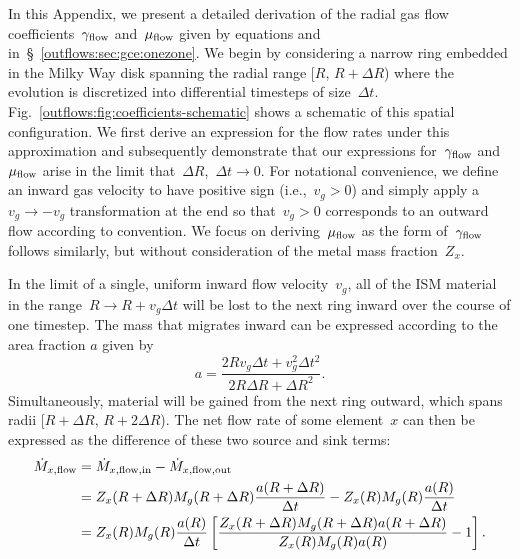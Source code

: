 \documentclass[main.tex]{subfiles}
\begin{document}
In this Appendix, we present a detailed derivation of the radial gas flow
coefficients~$\gamma_{\text{flow}}$ and~$\mu_{\text{flow}}$ given by equations
 and~
in~\S~\ref{outflows:sec:gce:onezone}.
We begin by considering a narrow ring embedded in the Milky Way disk spanning
the radial range [$R$, $R + \Delta R$) where the evolution is discretized into
differential timesteps of size~$\Delta t$.
Fig.~\ref{outflows:fig:coefficients-schematic} shows a schematic of this
spatial configuration.
We first derive an expression for the flow rates under this approximation and
subsequently demonstrate that our expressions for~$\gamma_{\text{flow}}$
and~$\mu_{\text{flow}}$ arise in the limit that~$\Delta R$,~$\Delta t \rightarrow 0$.
For notational convenience, we define an inward gas velocity to have positive
sign (i.e.,~$v_g > 0$) and simply apply a~$v_g \rightarrow -v_g$ transformation
at the end so that~$v_g > 0$ corresponds to an outward flow according to
convention.
We focus on deriving~$\mu_{\text{flow}}$ as the form of~$\gamma_{\text{flow}}$ follows
similarly, but without consideration of the metal mass fraction~$Z_x$.
\par
In the limit of a single, uniform inward flow velocity~$v_g$, all of the ISM
material in the range~$R \rightarrow R + v_g \Delta t$ will be lost to the
next ring inward over the course of one timestep.
The mass that migrates inward can be expressed according to the area fraction
$a$ given by
\begin{equation}
a = \frac{
	2 R v_g \Delta t + v_g^2 \Delta t^2
}{
	2 R \Delta R + \Delta R^2
}.
\label{outflows:eq:area-frac-def}
\end{equation}
Simultaneously, material will be gained from the next ring outward, which spans
radii [$R + \Delta R$, $R + 2\Delta R$).
The net flow rate of some element~$x$ can then be expressed as the difference
of these two source and sink terms:
\begin{equation}\begin{split}
\dot{M}_{x,\text{flow}} &= \dot{M}_{x,\text{flow},\text{in}} -
\dot{M}_{x,\text{flow},\text{out}}
\\
&= Z_x(R + \Delta R) M_g(R + \Delta R) \frac{a(R + \Delta R)}{\Delta t} -
Z_x(R) M_g(R) \frac{a(R)}{\Delta t}
\\
&= Z_x(R) M_g(R) \frac{a(R)}{\Delta t}
\left[
\frac{Z_x(R + \Delta R) M_g(R + \Delta R) a(R + \Delta R)}{Z_x(R) M_g(R) a(R)}
- 1\right].
\label{outflows:eq:flowin-minus-flowout}
\end{split}\end{equation}
\end{document}
